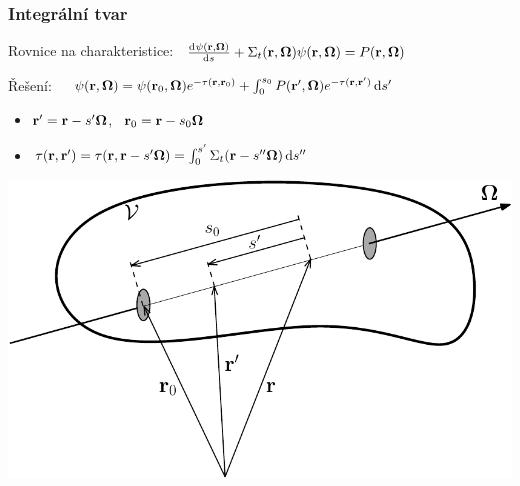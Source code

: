 \begin{frame}
  \frametitle{Integrální tvar}
  
  \begin{myitemize}
    \item Rovnice na charakteristice:~ $\frac{\mathrm{d}^{}{\psi(\mathbf{r},\mathbf{\Omega})}}{\mathrm{d} {s}^{}} + \Sigma_t(\mathbf{r},\mathbf{\Omega})\psi(\mathbf{r},\mathbf{\Omega}) = P(\mathbf{r},\mathbf{\Omega})$
    \item Řešení:~~ $\psi(\mathbf{r},\mathbf{\Omega}) = \psi(\mathbf{r}_0,\mathbf{\Omega})e^{-\tau(\mathbf{r},\mathbf{r}_0)} + \int_0^{s_0} P(\mathbf{r}',\mathbf{\Omega})e^{-\tau(\mathbf{r},\mathbf{r}')}\,\mathrm{d}s'\,$
    \begin{itemize}
    	\item $\mathbf{r}' = \mathbf{r} - s' \mathbf{\Omega}$,~ $\mathbf{r}_0 = \mathbf{r} - s_0 \mathbf{\Omega}$\\[.2em]
    	\item $\tau(\mathbf{r},\mathbf{r}') = \tau(\mathbf{r},\mathbf{r}-s'\mathbf{\Omega}) = \int_0^{s'} \Sigma_t(\mathbf{r} - s''\mathbf{\Omega})\,\mathrm{d}s''\,$
    \end{itemize}
  \end{myitemize}
  \vspace{-.5em}
  \begin{center}
    \includegraphics[scale=.5]{obr/trepka}
  \end{center}
  \vspace{-1em}
\end{frame}

